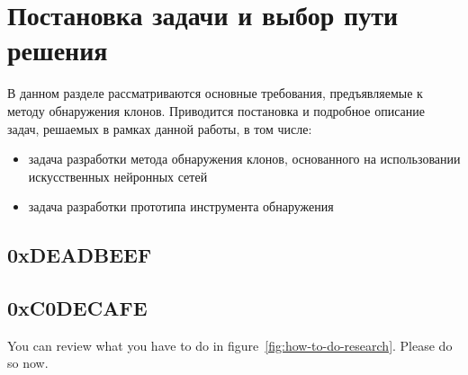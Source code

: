\chapter{Постановка задачи и выбор пути решения}

В данном разделе рассматриваются основные требования, предъявляемые к методу обнаружения клонов. Приводится постановка и подробное описание задач, решаемых в рамках данной работы, в том числе:
\begin{itemize}
\setlength\itemsep{0mm}
\item задача разработки метода обнаружения клонов, основанного на использовании искусственных нейронных сетей
\item задача разработки прототипа инструмента обнаружения
\end{itemize}
\section{0xDEADBEEF}

\Blindtext

\section{0xC0DECAFE}

You can review what you have to do in figure~\ref{fig:how-to-do-research}.
Please do so now. \blindtext

\Blindtext
